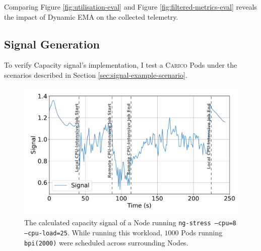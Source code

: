 Comparing Figure \ref{fig:utilisation-eval} and Figure
\ref{fig:filtered-metrics-eval} reveals the impact of Dynamic EMA on the
collected telemetry.

%
\subsection{Signal Generation}
%
To verify Capacity signal's implementation, I test a \textsc{Carico} Pods under
the scenarios described in Section \ref{sec:signal-example-scenario}.

\begin{figure}[ht]
    \centering
    \includegraphics[width=\textwidth]{images/signal-with-cpu.pdf}
    \caption{The calculated capacity signal of a Node running \texttt{ng-stress
    --cpu=8 --cpu-load=25}. While running this workload, $1000$ Pods running
    \texttt{bpi(2000)} were scheduled across surrounding Nodes.}
    \label{fig:signal-evaluation-cpu}
\end{figure}
%

